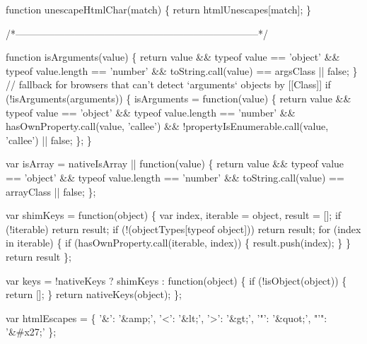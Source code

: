 \begin{DoxyCodeInclude}
{{  \textcolor{keyword}{function} unescapeHtmlChar(match) \{
    \textcolor{keywordflow}{return} htmlUnescapes[match];
  \}

  \textcolor{comment}{/*--------------------------------------------------------------------------*/}

  \textcolor{keyword}{function} isArguments(value) \{
    \textcolor{keywordflow}{return} value && typeof value == \textcolor{stringliteral}{'object'} && typeof value.length == \textcolor{stringliteral}{'number'} &&
      toString.call(value) == argsClass || \textcolor{keyword}{false};
  \}
  \textcolor{comment}{// fallback for browsers that can't detect `arguments` objects by [[Class]]}
  \textcolor{keywordflow}{if} (!isArguments(arguments)) \{
    isArguments = \textcolor{keyword}{function}(value) \{
      \textcolor{keywordflow}{return} value && typeof value == \textcolor{stringliteral}{'object'} && typeof value.length == \textcolor{stringliteral}{'number'} &&
        hasOwnProperty.call(value, \textcolor{stringliteral}{'callee'}) && !propertyIsEnumerable.call(value, \textcolor{stringliteral}{'callee'}) || \textcolor{keyword}{false};
    \};
  \}

  var isArray = nativeIsArray || \textcolor{keyword}{function}(value) \{
    \textcolor{keywordflow}{return} value && typeof value == \textcolor{stringliteral}{'object'} && typeof value.length == \textcolor{stringliteral}{'number'} &&
      toString.call(value) == arrayClass || \textcolor{keyword}{false};
  \};

  var shimKeys = \textcolor{keyword}{function}(object) \{
    var index, iterable = object, result = [];
    \textcolor{keywordflow}{if} (!iterable) \textcolor{keywordflow}{return} result;
    \textcolor{keywordflow}{if} (!(objectTypes[typeof \textcolor{keywordtype}{object}])) \textcolor{keywordflow}{return} result;
      \textcolor{keywordflow}{for} (index in iterable) \{
        \textcolor{keywordflow}{if} (hasOwnProperty.call(iterable, index)) \{
          result.push(index);
        \}
      \}
    \textcolor{keywordflow}{return} result
  \};

  var keys = !nativeKeys ? shimKeys : \textcolor{keyword}{function}(object) \{
    \textcolor{keywordflow}{if} (!isObject(\textcolor{keywordtype}{object})) \{
      \textcolor{keywordflow}{return} [];
    \}
    \textcolor{keywordflow}{return} nativeKeys(\textcolor{keywordtype}{object});
  \};

  var htmlEscapes = \{
    \textcolor{charliteral}{'&'}: \textcolor{stringliteral}{'&amp;'},
    \textcolor{charliteral}{'<'}: \textcolor{stringliteral}{'&lt;'},
    \textcolor{charliteral}{'>'}: \textcolor{stringliteral}{'&gt;'},
    \textcolor{charliteral}{'"'}: \textcolor{stringliteral}{'&quot;'},
    \textcolor{stringliteral}{"'"}: \textcolor{stringliteral}{'&#x27;'}
  \};

}}
\end{DoxyCodeInclude}
